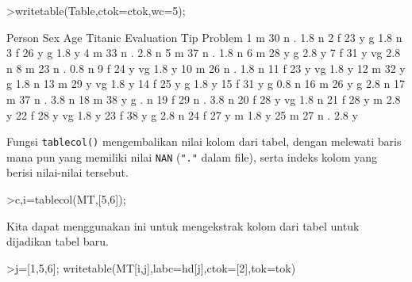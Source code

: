 \documentclass[a4paper,11pt,oneside,enabledeprecatedfontcommands]{scrbook}
\newenvironment{eulernotebook}{}{}
\newenvironment{eulercomment}{\par\medskip\noindent}{\par\medskip}
\begin{document}
\begin{eulernotebook}
\begin{eulercomment}
		\end{eulercomment}
		\begin{eulerprompt}
			>writetable(Table,ctok=ctok,wc=5);
		\end{eulerprompt}
		\begin{euleroutput}
			 Person  Sex  Age Titanic Evaluation  Tip Problem
			      1    m   30       n          .  1.8       n
			      2    f   23       y          g  1.8       n
			      3    f   26       y          g  1.8       y
			      4    m   33       n          .  2.8       n
			      5    m   37       n          .  1.8       n
			      6    m   28       y          g  2.8       y
			      7    f   31       y         vg  2.8       n
			      8    m   23       n          .  0.8       n
			      9    f   24       y         vg  1.8       y
			     10    m   26       n          .  1.8       n
			     11    f   23       y         vg  1.8       y
			     12    m   32       y          g  1.8       n
			     13    m   29       y         vg  1.8       y
			     14    f   25       y          g  1.8       y
			     15    f   31       y          g  0.8       n
			     16    m   26       y          g  2.8       n
			     17    m   37       n          .  3.8       n
			     18    m   38       y          g    .       n
			     19    f   29       n          .  3.8       n
			     20    f   28       y         vg  1.8       n
			     21    f   28       y          m  2.8       y
			     22    f   28       y         vg  1.8       y
			     23    f   38       y          g  2.8       n
			     24    f   27       y          m  1.8       y
			     25    m   27       n          .  2.8       y
		\end{euleroutput}
		\begin{eulercomment}
			Fungsi \texttt{tablecol()} mengembalikan nilai kolom dari tabel, dengan melewati baris mana pun yang memiliki
			nilai \texttt{NAN} (\texttt{"."} dalam file), serta indeks kolom yang berisi nilai-nilai tersebut.
		\end{eulercomment}
		\begin{eulerprompt}
			>{c,i}=tablecol(MT,[5,6]);
		\end{eulerprompt}
		\begin{eulercomment}
			Kita dapat menggunakan ini untuk mengekstrak kolom dari tabel untuk dijadikan tabel baru.
		\end{eulercomment}
		\begin{eulerprompt}
			>j=[1,5,6]; writetable(MT[i,j],labc=hd[j],ctok=[2],tok=tok)
		\end{eulerprompt}

\end{eulernotebook}
\end{document}
